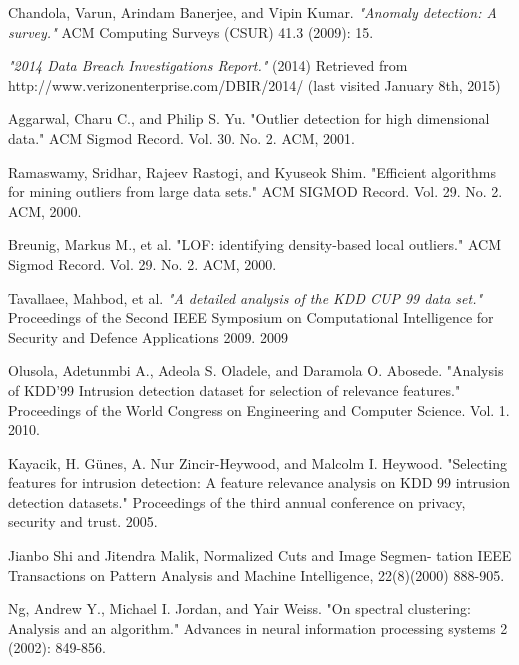 \begin{thebibliography}{9}

Chandola, Varun, Arindam Banerjee, and Vipin Kumar. \emph{"Anomaly detection: A survey."} ACM Computing Surveys (CSUR) 41.3 (2009): 15.

\emph{"2014 Data Breach Investigations Report."} (2014) Retrieved from http://www.verizonenterprise.com/DBIR/2014/ (last visited January 8th, 2015)

Aggarwal, Charu C., and Philip S. Yu. "Outlier detection for high dimensional data." ACM Sigmod Record. Vol. 30. No. 2. ACM, 2001.

Ramaswamy, Sridhar, Rajeev Rastogi, and Kyuseok Shim. "Efficient algorithms for mining outliers from large data sets." ACM SIGMOD Record. Vol. 29. No. 2. ACM, 2000.

Breunig, Markus M., et al. "LOF: identifying density-based local outliers." ACM Sigmod Record. Vol. 29. No. 2. ACM, 2000.

Tavallaee, Mahbod, et al. \emph{"A detailed analysis of the KDD CUP 99 data set."} Proceedings of the Second IEEE Symposium on Computational Intelligence for Security and Defence Applications 2009. 2009

Olusola, Adetunmbi A., Adeola S. Oladele, and Daramola O. Abosede. "Analysis of KDD’99 Intrusion detection dataset for selection of relevance features." Proceedings of the World Congress on Engineering and Computer Science. Vol. 1. 2010.

Kayacik, H. Günes, A. Nur Zincir-Heywood, and Malcolm I. Heywood. "Selecting features for intrusion detection: A feature relevance analysis on KDD 99 intrusion detection datasets." Proceedings of the third annual conference on privacy, security and trust. 2005.

Jianbo Shi and Jitendra Malik, Normalized Cuts and Image Segmen- tation IEEE Transactions on Pattern Analysis and Machine Intelligence, 22(8)(2000) 888-905.

Ng, Andrew Y., Michael I. Jordan, and Yair Weiss. "On spectral clustering: Analysis and an algorithm." Advances in neural information processing systems 2 (2002): 849-856.


\end{thebibliography}
